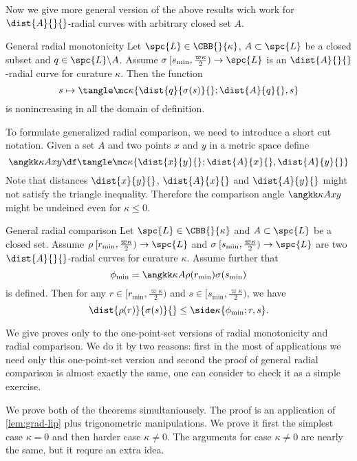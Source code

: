 Now we give more general version of the above results wich work for $\dist{A}{}{}$-radial curves with arbitrary closed set $A$.

\begin{thm}{General radial monotonicity}\label{gen-rad-mon}
Let $\spc{L}\in\CBB{}{\kappa}$,
$A\subset \spc{L}$ be a closed subset
and $q\in\spc{L}\backslash A$.
Assume $\sigma\:  [s_{\min},\tfrac{\varpi\kappa}2)\to \spc{L}$
is an $\dist{A}{}{}$-radial curve for curature $\kappa$.
Then the function 
$$s\mapsto 
\tangle\mc\kappa\{
\dist{q}{\sigma(s)}{};
\dist{A}{q}{},
s
\}$$
is nonincreasing in all the domain of definition.
\end{thm}

To formulate generalized radial comparison,
we need to introduce a short cut notation.
Given a set $A$ and two points $x$ and $y$ in a metric space define
$$
\angkk\kappa A{x}{y}
\df
\tangle\mc\kappa\{
\dist{x}{y}{};
\dist{A}{x}{},
\dist{A}{y}{}
\}
$$
Note that distances $\dist{x}{y}{}$, 
$\dist{A}{x}{}$ and 
$\dist{A}{y}{}$ might not satisfy the triangle inequality.
Therefore the comparison angle $
\angkk\kappa A{x}{y}$ might be undeined even for $\kappa\le0$.

\begin{thm}{General radial comparison}\label{gen-rad-comp}
Let $\spc{L}\in\CBB{}{\kappa}$ 
and $A\subset \spc{L}$ be a closed set.
Assume $\rho\:  [r_{\min},\tfrac{\varpi\kappa}2)\to \spc{L}$
and    $\sigma\:[s_{\min},\tfrac{\varpi\kappa}2)\to \spc{L}$
are two $\dist{A}{}{}$-radial curves for curature $\kappa$.
Assume further that 
$$\phi_{\min}
=
\angkk\kappa A{\rho(r_{\min})}{\sigma(s_{\min})}
$$
is defined.
Then for any $r\in[r_{\min},\tfrac{\varpi\kappa}2)$ and  $s\in[s_{\min},\tfrac{\varpi\kappa}2)$,
we have
$$
\dist{\rho(r)}{\sigma(s)}{}
\le \side\kappa\{\phi_{\min};r,s\}.
$$

\end{thm}

We give proves only to the one-point-set versions of radial monotonicity and radial comparison.
We do it by two reasons: first in the most of applications we need only this one-point-set version and
second the proof of general radial comparison is almost exactly the same, one can consider to check it as a simple exercise.

We prove both of the theorems simultaniousely.
The proof is an application of \ref{lem:grad-lip} plus trigonometric manipulations.
We prove it first the simplest case $\kappa=0$
and then harder case $\kappa\not=0$.
The arguments for case $\kappa\not=0$ are nearly the same, but it requre an extra idea.

